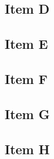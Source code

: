 \subsection*{Item D}


\subsection*{Item E}


\subsection*{Item F}

\subsection*{Item G}

\subsection*{Item H}

